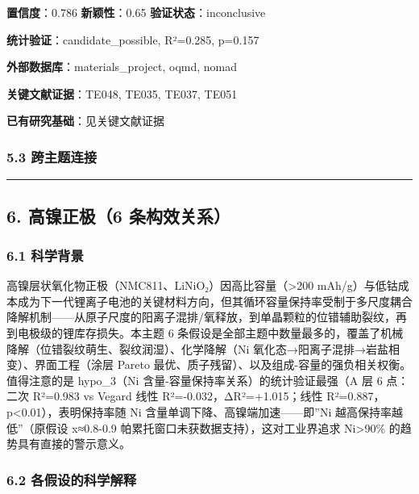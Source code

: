 \documentclass[12pt,a4paper]{ctexart}
\begin{document}
\textbf{置信度}：0.786 \textbar{} \textbf{新颖性}：0.65 \textbar{} \textbf{验证状态}：inconclusive

\textbf{统计验证}：candidate\_possible, R²=0.285, p=0.157

\textbf{外部数据库}：materials\_project, oqmd, nomad

\textbf{关键文献证据}：TE048, TE035, TE037, TE051

\textbf{已有研究基础}：见关键文献证据

\subsubsection{5.3 跨主题连接}\label{ux8de8ux4e3bux9898ux8fdeux63a5-2}

\begin{center}\rule{0.5\linewidth}{0.5pt}\end{center}

\subsection{6. 高镍正极（6 条构效关系）}\label{ux9ad8ux954dux6b63ux67816-ux6761ux6784ux6548ux5173ux7cfb}

\subsubsection{6.1 科学背景}\label{ux79d1ux5b66ux80ccux666f-4}

高镍层状氧化物正极（NMC811、LiNiO₂）因高比容量（\textgreater200 mAh/g）与低钴成本成为下一代锂离子电池的关键材料方向，但其循环容量保持率受制于多尺度耦合降解机制------从原子尺度的阳离子混排/氧释放，到单晶颗粒的位错辅助裂纹，再到电极级的锂库存损失。本主题 6 条假设是全部主题中数量最多的，覆盖了机械降解（位错裂纹萌生、裂纹润湿）、化学降解（Ni 氧化态→阳离子混排→岩盐相变）、界面工程（涂层 Pareto 最优、质子残留）、以及组成-容量的强负相关权衡。值得注意的是 hypo\_3（Ni 含量-容量保持率关系）的统计验证最强（A 层 6 点：二次 R²=0.983 vs Vegard 线性 R²=-0.032，ΔR²=+1.015；线性 R²=0.887，p\textless0.01），表明保持率随 Ni 含量单调下降、高镍端加速------即''Ni 越高保持率越低''（原假设 x≈0.8-0.9 帕累托窗口未获数据支持），这对工业界追求 Ni\textgreater90\% 的趋势具有直接的警示意义。

\subsubsection{6.2 各假设的科学解释}\label{ux5404ux5047ux8bbeux7684ux79d1ux5b66ux89e3ux91ca-4}
\end{document}
